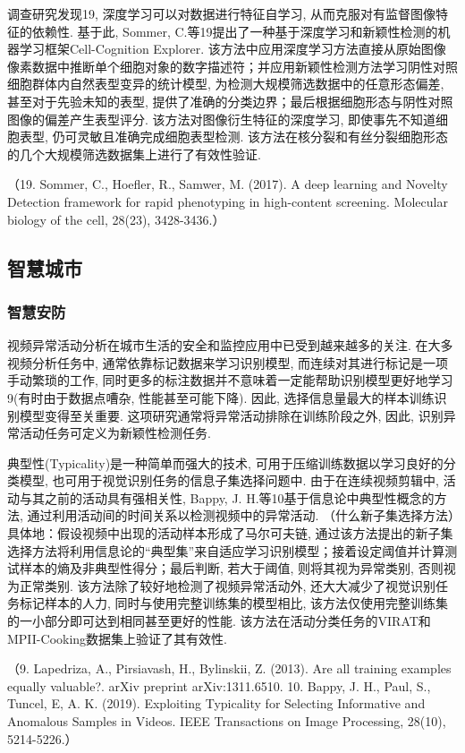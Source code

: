 \documentclass{Style/aas}
\begin{document}
\begin{multicols}{2}
  调查研究发现19, 深度学习可以对数据进行特征自学习, 从而克服对有监督图像特征的依赖性. 基于此, Sommer, C.等19提出了一种基于深度学习和新颖性检测的机器学习框架Cell-Cognition Explorer. 该方法中应用深度学习方法直接从原始图像像素数据中推断单个细胞对象的数字描述符；并应用新颖性检测方法学习阴性对照细胞群体内自然表型变异的统计模型, 为检测大规模筛选数据中的任意形态偏差, 甚至对于先验未知的表型, 提供了准确的分类边界；最后根据细胞形态与阴性对照图像的偏差产生表型评分. 该方法对图像衍生特征的深度学习, 即使事先不知道细胞表型, 仍可灵敏且准确完成细胞表型检测. 该方法在核分裂和有丝分裂细胞形态的几个大规模筛选数据集上进行了有效性验证.

  （19.	Sommer, C., Hoefler, R., Samwer, M. (2017). A deep learning and Novelty Detection framework for rapid phenotyping in high-content screening. Molecular biology of the cell, 28(23), 3428-3436.）

  \subsection{智慧城市}
  \subsubsection{智慧安防}
  视频异常活动分析在城市生活的安全和监控应用中已受到越来越多的关注. 在大多视频分析任务中, 通常依靠标记数据来学习识别模型, 而连续对其进行标记是一项手动繁琐的工作, 同时更多的标注数据并不意味着一定能帮助识别模型更好地学习9(有时由于数据点嘈杂, 性能甚至可能下降). 因此, 选择信息量最大的样本训练识别模型变得至关重要. 这项研究通常将异常活动排除在训练阶段之外, 因此, 识别异常活动任务可定义为新颖性检测任务.

  典型性(Typicality)是一种简单而强大的技术, 可用于压缩训练数据以学习良好的分类模型, 也可用于视觉识别任务的信息子集选择问题中. 由于在连续视频剪辑中, 活动与其之前的活动具有强相关性, Bappy, J. H.等10基于信息论中典型性概念的方法, 通过利用活动间的时间关系以检测视频中的异常活动. （什么新子集选择方法）具体地：假设视频中出现的活动样本形成了马尔可夫链, 通过该方法提出的新子集选择方法将利用信息论的“典型集”来自适应学习识别模型；接着设定阈值并计算测试样本的熵及非典型性得分；最后判断, 若大于阈值, 则将其视为异常类别, 否则视为正常类别. 该方法除了较好地检测了视频异常活动外, 还大大减少了视觉识别任务标记样本的人力, 同时与使用完整训练集的模型相比, 该方法仅使用完整训练集的一小部分即可达到相同甚至更好的性能. 该方法在活动分类任务的VIRAT和MPII-Cooking数据集上验证了其有效性.

  （9.	Lapedriza, A., Pirsiavash, H., Bylinskii, Z. (2013). Are all training examples equally valuable?. arXiv preprint arXiv:1311.6510.
  10.	Bappy, J. H., Paul, S., Tuncel, E, A. K. (2019). Exploiting Typicality for Selecting Informative and Anomalous Samples in Videos. IEEE Transactions on Image Processing, 28(10), 5214-5226.）


\end{multicols}
\end{document}
